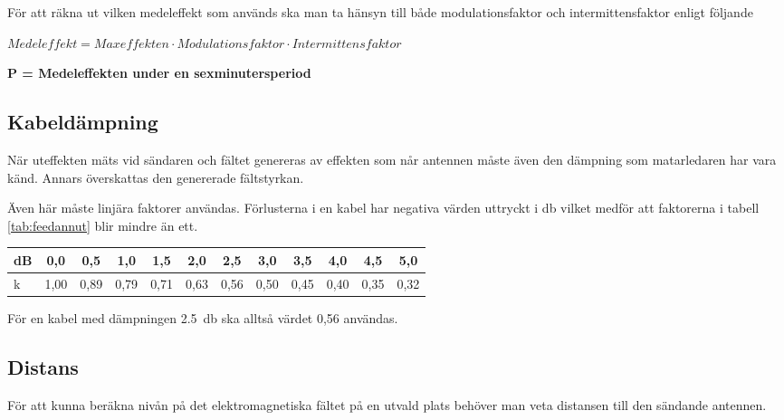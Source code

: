 För att räkna ut vilken medeleffekt som används ska man ta hänsyn
till både modulationsfaktor och intermittensfaktor enligt följande

\(\textit{Medeleffekt} = \textit{Maxeffekten} \cdot \textit{Modulationsfaktor} \cdot \textit{Intermittensfaktor}\)

\noindent\textbf{P = Medeleffekten under en sexminutersperiod}

\subsection{Kabeldämpning}

När uteffekten mäts vid sändaren och fältet genereras av effekten som
når antennen måste även den dämpning som matarledaren har vara känd.
Annars överskattas den genererade fältstyrkan.

Även här måste linjära faktorer användas.
Förlusterna i en kabel har negativa värden uttryckt i \si{\decibel} vilket
medför att faktorerna i tabell \ref{tab:feedannut} blir mindre än ett.

\begin{table*}[h]
  \begin{center}
    \begin{tabular}{|l|c|c|c|c|c|c|c|c|c|c|c|}
	\hline
	dB & 0,0  & 0,5  & 1,0  & 1,5  & 2,0  & 2,5  & 3,0  & 3,5  & 4,0  & 4,5  & 5,0 \\ \hline
	k  & 1,00 & 0,89 & 0,79 & 0,71 & 0,63 & 0,56 & 0,50 & 0,45 & 0,40 & 0,35 & 0,32 \\ \hline
    \end{tabular}
    \caption{k = Matarkabels dämpning i linjära termer}
    \label{tab:feedannut}
  \end{center}
\end{table*}

För en kabel med dämpningen \SI{2,5}{\decibel} ska alltså värdet 0,56 användas.


\subsection{Distans}

För att kunna beräkna nivån på det elektromagnetiska fältet på en utvald plats
behöver man veta distansen till den sändande antennen.


